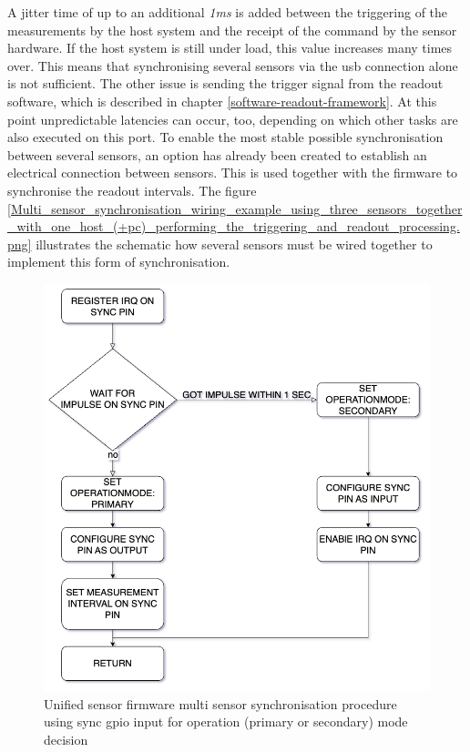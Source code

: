 A jitter time of up to an additional \emph{1ms} is added between the
triggering of the measurements by the host system and the receipt of the
command by the sensor hardware. If the host system is still under load,
this value increases many times over. This means that synchronising
several sensors via the \gls{usb} connection alone is not sufficient.
The other issue is sending the trigger signal from the readout software,
which is described in chapter \ref{software-readout-framework}. At this
point unpredictable latencies can occur, too, depending on which other
tasks are also executed on this port. To enable the most stable possible
synchronisation between several sensors, an option has already been
created to establish an electrical connection between sensors. This is
used together with the firmware to synchronise the readout intervals.
The figure
\ref{Multi_sensor_synchronisation_wiring_example_using_three_sensors_together_with_one_host_(+pc)_performing_the_triggering_and_readout_processing.png}
illustrates the schematic how several sensors must be wired together to
implement this form of synchronisation.

\begin{figure}
\centering
\includegraphics{./generated_images/border_Unified_sensor_firmware_multi_sensor_synchronisation_procedure_using_sync_(+gpio)_input_for_operation_(primary_or_secondary)_mode_decision.png}
\caption{Unified sensor firmware multi sensor synchronisation procedure
using sync \gls{gpio} input for operation (primary or secondary) mode
decision
\label{Unified_sensor_firmware_multi_sensor_synchronisation_procedure_using_sync_(+gpio)_input_for_operation_(primary_or_secondary)_mode_decision.png}}
\end{figure}

